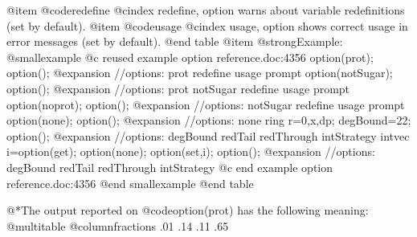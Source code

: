 {@item @code{redefine}
@cindex redefine, option
warns about variable redefinitions (set by default).
@item @code{usage}
@cindex usage, option
shows correct usage in error messages (set by default).
@end table
@item @strong{Example:}
@smallexample
@c reused example option reference.doc:4356 
  option(prot);
  option();
@expansion{} //options: prot redefine usage prompt
  option(notSugar);
  option();
@expansion{} //options: prot notSugar redefine usage prompt
  option(noprot);
  option();
@expansion{} //options: notSugar redefine usage prompt
  option(none);
  option();
@expansion{} //options: none
  ring r=0,x,dp;
  degBound=22;
  option();
@expansion{} //options: degBound redTail redThrough intStrategy
  intvec i=option(get);
  option(none);
  option(set,i);
  option();
@expansion{} //options: degBound redTail redThrough intStrategy
@c end example option reference.doc:4356
@end smallexample
@end table

@*The output reported on @code{option(prot)} has the following meaning:
@multitable @columnfractions .01 .14 .11 .65

}
